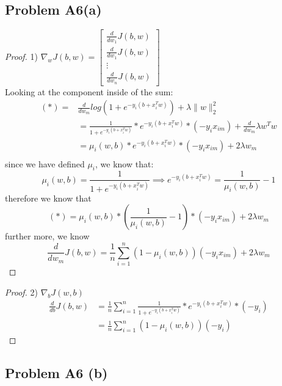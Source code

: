 \documentclass[12pt]{article}
\begin{document}
\subsection*{Problem A6(a)}
 \begin{proof}
         1) $\nabla_wJ(b,w) = 
\begin{bmatrix}
        \frac{d}{dw_1} J(b,w) \\
                \frac{d}{dw_1} J(b,w) \\
                \vdots \\
                        \frac{d}{dw_n} J(b,w) 
\end{bmatrix}
         $ \\
         Looking at the component inside of the sum: \\
         \[
\begin{aligned}
        (*) = & \frac{d}{dw_m} log(1 + e^{-y_i(b+x_i^Tw)}) + \lambda \|w\|_2^2 \\
              & = \frac{1}{1 + e^{-y_i(b+x_i^Tw)}} *  e^{-y_i(b+x_i^Tw)} *(-y_i x_{im})  + \frac{d}{dw_m} \lambda w^T w \\ 
        & =  \mu_i(w,b)*  e^{-y_i(b+x_i^Tw)} *(-y_i x_{im})  + 2\lambda w_m\\ 
\end{aligned}
         \]
      since we have defined $\mu_i$, we know that: \\
      $$\mu_i(w,b) =\frac{1}{1 + e^{-y_i(b+x_i^Tw)}}  \implies e^{-y_i(b+x_i^Tw)} = \frac{1}{\mu_i(w,b)}-1$$
      therefore we know that 
      $$ (*) =  \mu_i(w,b)* (\frac{1}{\mu_i(w,b)}-1) *(-y_i x_{im})  + 2\lambda w_m$$
      further more, we know\\
      $$ \frac{d}{dw_m} J(b,w) = \frac{1}{n}  \sum_{i=1}^{n} (1-\mu_i(w,b)) (-y_i x_{im}) + 2 \lambda w_m$$

\end{proof}

\begin{proof}
        2) $\nabla_bJ(w,b)$
        \[ 
\begin{aligned}
        \frac{d}{db} J(b,w) &= \frac{1}{n}      \sum_{i=1}^{n}  \frac{1}{1 + e^{-y_i(b+x_i^Tw)}} *  e^{-y_i(b+x_i^Tw)} *(-y_i )  \\ 
  &= \frac{1}{n}  \sum_{i=1}^{n} (1-\mu_i(w,b)) (-y_i) 
\end{aligned}
        \]
\end{proof}


\newpage
\subsection*{Problem A6 (b)}
\end{document}
